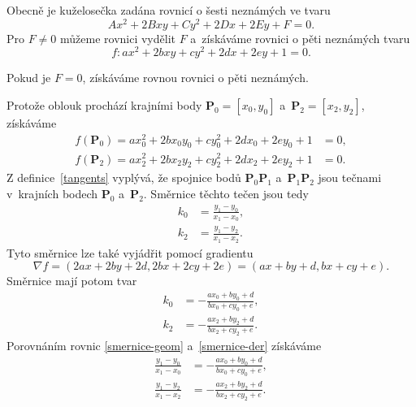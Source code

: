 Obecně je kuželosečka zadána rovnicí o šesti neznámých ve tvaru
\begin{equation}
Ax^2+2Bxy+Cy^2+2Dx+2Ey+F=0.
\end{equation}
Pro $F\neq0$ můžeme rovnici vydělit $F$ a~získáváme rovnici o pěti neznámých tvaru
\begin{equation}
	f: ax^2+2bxy+cy^2+2dx+2ey+1=0.
\end{equation}
\begin{poznamka}
	Pokud je $F=0$, získáváme rovnou rovnici o pěti neznámých.
\end{poznamka}
Protože oblouk prochází krajními body $\mathbf{P}_0=[x_0,y_0]$ a~$\mathbf{P}_2=[x_2,y_2]$, získáváme
\begin{subequations}
	\begin{align}
		f\left(\mathbf{P}_0\right)=ax_0^2+2bx_0y_0+cy_0^2+2dx_0+2ey_0+1&=0,\\
		f\left(\mathbf{P}_2\right)=ax_2^2+2bx_2y_2+cy_2^2+2dx_2+2ey_2+1&=0.
	\end{align}
\end{subequations}
Z definice~\ref{tangents} vyplývá, že spojnice bodů $\mathbf{P}_0\mathbf{P}_1$ a~$\mathbf{P}_1\mathbf{P}_2$ jsou tečnami v~krajních bodech $\mathbf{P}_0$ a~$\mathbf{P}_2$. Směrnice těchto tečen jsou tedy
\begin{subequations}\label{smernice-geom}
	\begin{align}
		k_0&=\frac{y_1-y_0}{x_1-x_0},\\
		k_2&=\frac{y_1-y_2}{x_1-x_2}.
	\end{align}
\end{subequations}
Tyto směrnice lze také vyjádřit pomocí gradientu
\begin{equation}
	\nabla f=\left(2ax+2by+2d,2bx+2cy+2e\right)=\left(ax+by+d,bx+cy+e\right).
\end{equation}
Směrnice mají potom tvar
\begin{subequations}\label{smernice-der}
	\begin{align}
		k_0&=-\frac{ax_0+by_0+d}{bx_0+cy_0+e},\\
		k_2&=-\frac{ax_2+by_2+d}{bx_2+cy_2+e}.
	\end{align}
\end{subequations}
Porovnáním rovnic \eqref{smernice-geom} a~\eqref{smernice-der} získáváme
\begin{subequations}
	\begin{align}
	\frac{y_1-y_0}{x_1-x_0}&=-\frac{ax_0+by_0+d}{bx_0+cy_0+e},\\
	\frac{y_1-y_2}{x_1-x_2}&=-\frac{ax_2+by_2+d}{bx_2+cy_2+e}.
	\end{align}
\end{subequations}

